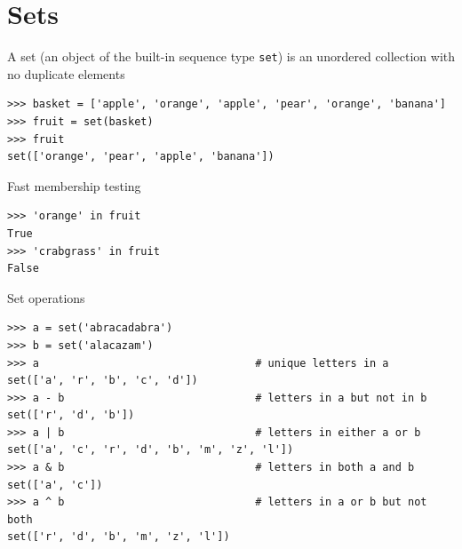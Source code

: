 \documentclass[8pt,a4paper,compress]{beamer}
\begin{document}
\section{Sets}
\begin{frame}[fragile]
\pause

A set (an object of the built-in sequence type \lstinline{set}) is an unordered collection with no duplicate elements

\smallskip

\begin{lstlisting}[language={},style=focusin]
>>> basket = ['apple', 'orange', 'apple', 'pear', 'orange', 'banana']
>>> fruit = set(basket)
>>> fruit
set(['orange', 'pear', 'apple', 'banana'])
\end{lstlisting}

\pause\bigskip

Fast membership testing

\smallskip

\begin{lstlisting}[language={},style=focusin]
>>> 'orange' in fruit
True
>>> 'crabgrass' in fruit
False
\end{lstlisting}

\pause\bigskip

Set operations

\smallskip

\begin{lstlisting}[language={},style=focusin]
>>> a = set('abracadabra')
>>> b = set('alacazam')
>>> a                                  # unique letters in a
set(['a', 'r', 'b', 'c', 'd'])
>>> a - b                              # letters in a but not in b
set(['r', 'd', 'b'])
>>> a | b                              # letters in either a or b
set(['a', 'c', 'r', 'd', 'b', 'm', 'z', 'l'])
>>> a & b                              # letters in both a and b
set(['a', 'c'])
>>> a ^ b                              # letters in a or b but not both
set(['r', 'd', 'b', 'm', 'z', 'l'])
\end{lstlisting}
\end{frame}
\end{document}
